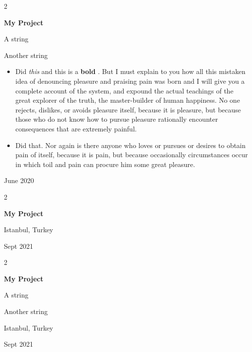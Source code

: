 \documentclass[10pt, letterpaper]{article}
\newenvironment{summary}{
    \begin{description}[
        topsep=0.10 cm,
        parsep=0.10 cm,
        partopsep=0pt,
        itemsep=0pt,
        leftmargin=0.4 cm + 10pt
    ]
}{
    \end{description}
} %
\newenvironment{highlights}{
    \begin{itemize}[
        topsep=0.10 cm,
        parsep=0.10 cm,
        partopsep=0pt,
        itemsep=0pt,
        leftmargin=0.4 cm + 10pt
    ]
}{
    \end{itemize}
} %
\newenvironment{twocolentry}[2][]{
    \onecolentry
    \def\secondColumn{#2}
    \setcolumnwidth{\fill, 4.5 cm}
    \begin{paracol}{2}
}{
    \switchcolumn \raggedleft \secondColumn
    \end{paracol}
    \endonecolentry
} %
\let\hrefWithoutArrow\href
\renewcommand{\href}[2]{\hrefWithoutArrow{#1}{\ifthenelse{\equal{#2}{}}{ }{#2 }\raisebox{.15ex}{\footnotesize \faExternalLink*}}}
\begin{document}
        \vspace{0.2 cm}

        \begin{twocolentry}{
            June 2020
        }
            \textbf{My Project}
            \begin{summary}
                \item A string
                \item Another string
            \end{summary}
            \begin{highlights}
                \item Did \textit{this} and this is a \textbf{bold} \href{https://example.com}{link}. But I must explain to you how all this mistaken idea of denouncing pleasure and praising pain was born and I will give you a complete account of the system, and expound the actual teachings of the great explorer of the truth, the master-builder of human happiness. No one rejects, dislikes, or avoids pleasure itself, because it is pleasure, but because those who do not know how to pursue pleasure rationally encounter consequences that are extremely painful.
                \item Did that. Nor again is there anyone who loves or pursues or desires to obtain pain of itself, because it is pain, but because occasionally circumstances occur in which toil and pain can procure him some great pleasure.
            \end{highlights}
        \end{twocolentry}


        \vspace{0.2 cm}

        \begin{twocolentry}{
            Istanbul, Turkey

        Sept 2021
        }
            \textbf{My Project}
        \end{twocolentry}


        \vspace{0.2 cm}

        \begin{twocolentry}{
            Istanbul, Turkey

        Sept 2021
        }
            \textbf{My Project}
            \begin{summary}
                \item A string
                \item Another string
            \end{summary}
        \end{twocolentry}
\end{document}
